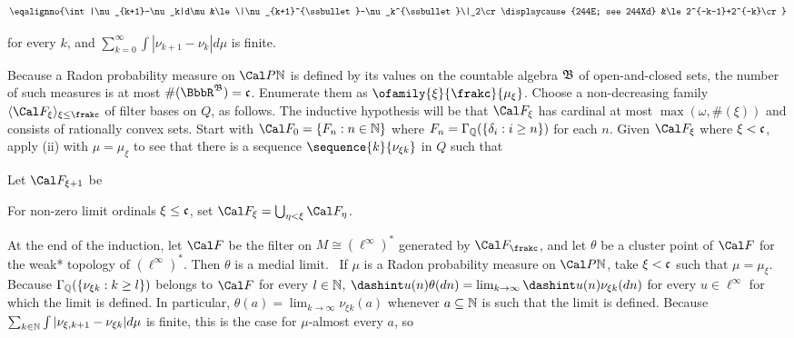 {$$\eqalignno{\int|\nu_{k+1}-\nu_k|d\mu
&\le\|\nu_{k+1}^{\ssbullet}-\nu_k^{\ssbullet}\|_2\cr
\displaycause{244E;  see 244Xd}
&\le 2^{-k-1}+2^{-k}\cr}$$

\noindent for every $k$, and
$\sum_{k=0}^{\infty}\int|\nu_{k+1}-\nu_k|d\mu$
is finite.\ \Qed

\medskip

 Because a Radon
probability measure on $\Cal P\Bbb N$ is defined by its
values on the countable algebra $\frak B$ of open-and-closed sets, the
number of such measures is at most $\#(\BbbR^{\frak B})=\frak c$.
Enumerate them as $\ofamily{\xi}{\frakc}{\mu_{\xi}}$.   Choose a
non-decreasing family
$\langle\Cal F_{\xi}\rangle_{\xi\le\frakc}$ of filter bases on $Q$, as
follows.   The inductive hypothesis will be that $\Cal F_{\xi}$ has
cardinal at most $\max(\omega,\#(\xi))$ and consists of rationally convex
sets.   Start with $\Cal F_0=\{F_n:n\in\Bbb N\}$ where
$F_n=\Gamma_{\Bbb Q}(\{\delta_i:i\ge n\})$ for each $n$.
Given $\Cal F_{\xi}$ where $\xi<\frak c$, apply (ii) with
$\mu=\mu_{\xi}$ to see that there is
a sequence $\sequence{k}{\nu_{\xi k}}$ in $Q$ such that


\noindent Let $\Cal F_{\xi+1}$ be


\noindent For non-zero limit ordinals $\xi\le\frak c$, set
$\Cal F_{\xi}=\bigcup_{\eta<\xi}\Cal F_{\eta}$.

\medskip

 At the end of the induction, let $\Cal F$ be the filter on
$M\cong(\ell^{\infty})^*$
generated by $\Cal F_{\frakc}$, and let $\theta$ be a cluster point of
$\Cal F$ for the
weak* topology of $(\ell^{\infty})^*$.   Then $\theta$ is a medial limit.
\Prf\ If $\mu$ is a Radon probability measure on $\Cal P\Bbb N$,
take $\xi<\frak c$ such that $\mu=\mu_{\xi}$.   Because
$\Gamma_{\Bbb Q}(\{\nu_{\xi k}:k\ge l\})$ belongs to $\Cal F$ for every
$l\in\Bbb N$,
$\dashint u(n)\theta(dn)=\lim_{k\to\infty}\dashint u(n)\nu_{\xi k}(dn)$ for every
$u\in\ell^{\infty}$ for which the limit is defined.   In particular,
$\theta(a)=\lim_{k\to\infty}\nu_{\xi k}(a)$ whenever $a\subseteq\Bbb N$ is
such that the limit is defined.   Because
$\sum_{k\in\Bbb N}\int|\nu_{\xi,k+1}-\nu_{\xi k}|d\mu$ is finite,
this is the case for $\mu$-almost every $a$, so

}
